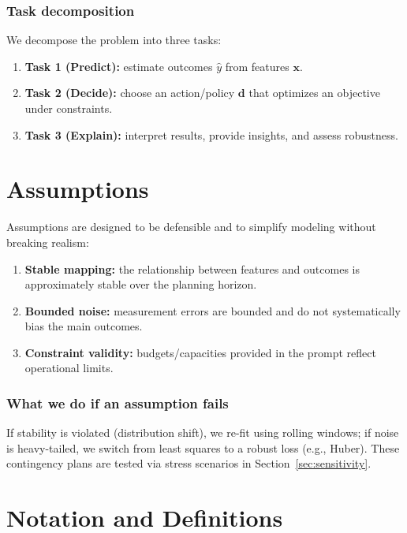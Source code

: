 \documentclass[12pt]{article}
\newcommand{\vect}[1]{\boldsymbol{#1}}
\begin{document}
\subsubsection{Task decomposition}
We decompose the problem into three tasks:
\begin{enumerate}[leftmargin=*]
  \item \textbf{Task 1 (Predict):} estimate outcomes $\hat{y}$ from features $\vect{x}$.
  \item \textbf{Task 2 (Decide):} choose an action/policy $\vect{d}$ that optimizes an objective under constraints.
  \item \textbf{Task 3 (Explain):} interpret results, provide insights, and assess robustness.
\end{enumerate}

\section{Assumptions}
Assumptions are designed to be defensible and to simplify modeling without breaking realism:
\begin{enumerate}[leftmargin=*]
  \item \textbf{Stable mapping:} the relationship between features and outcomes is approximately stable over the planning horizon.
  \item \textbf{Bounded noise:} measurement errors are bounded and do not systematically bias the main outcomes.
  \item \textbf{Constraint validity:} budgets/capacities provided in the prompt reflect operational limits.
\end{enumerate}

\subsubsection{What we do if an assumption fails}
If stability is violated (distribution shift), we re-fit using rolling windows; if noise is heavy-tailed, we switch from least squares
to a robust loss (e.g., Huber). These contingency plans are tested via stress scenarios in Section~\ref{sec:sensitivity}.

\section{Notation and Definitions}
\end{document}

